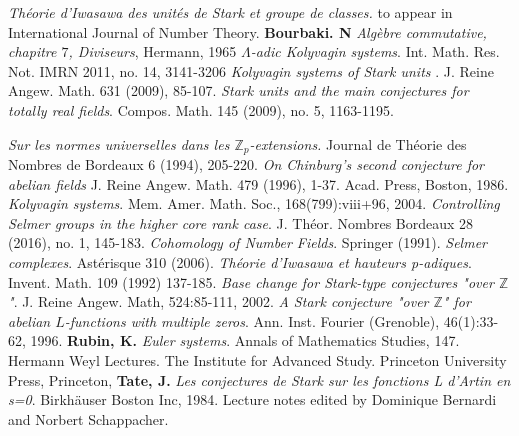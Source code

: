\documentclass[reqno]{amsart}
\begin{document}
\begin{thebibliography}{99}
     \setlength{\parskip}{0cm}
   {\it  Théorie d'Iwasawa des unités de Stark et groupe de
  classes.} to appear in  International Journal of Number Theory.
   {\bf Bourbaki. N} {\it Algèbre commutative, chapitre $7$, Diviseurs}, Hermann, 1965
    {\it $\Lambda$-adic Kolyvagin systems}. Int. Math. Res. Not. IMRN 2011, no. 14, 3141-3206
  {\it Kolyvagin systems of Stark
 units }. J. Reine Angew. Math. 631 (2009), 85-107.
      {\it Stark units and the main conjectures for totally real fields}.
      Compos. Math. 145 (2009), no. 5, 1163-1195.
 
 

 
  {\it Sur les normes universelles dans
les $\mathbb{Z}_{p}$-extensions.} Journal de Théorie des Nombres de
Bordeaux 6 (1994), 205-220.
  {\it On Chinburg's second conjecture for abelian fields}
 J. Reine Angew. Math. 479 (1996), 1-37.
Acad. Press, Boston, 1986.
  {\it Kolyvagin systems}. Mem. Amer. Math. Soc., 168(799):\textrm{viii}+96, 2004.
 {\it Controlling Selmer groups in the higher core rank
case}. J. Théor. Nombres Bordeaux 28 (2016), no. 1, 145-183.
 {\it Cohomology of Number Fields}. Springer (1991).
 {\it Selmer complexes}. Astérisque 310 (2006).
 {\it Théorie d'Iwasawa et hauteurs p-adiques}. Invent. Math. 109 (1992) 137-185.
 {\it Base change for Stark-type conjectures "over
$\mathbb{Z}$"}. J. Reine Angew. Math, 524:85-111, 2002.
 {\it  A Stark conjecture "over $\mathbb{Z}$" for abelian $L$-functions with multiple
zeros}. Ann. Inst. Fourier (Grenoble), 46(1):33-62, 1996.
   {\bf    Rubin, K.} {\it  Euler systems}. Annals of Mathematics Studies, 147.
        Hermann Weyl Lectures. The Institute for Advanced Study. Princeton
        University Press, Princeton,
  {\bf Tate, J.} {\it Les conjectures de Stark sur les fonctions L d'Artin en s=0}.
Birkh\"{a}user Boston Inc, 1984. Lecture notes edited by Dominique
Bernardi and Norbert Schappacher.
\end{thebibliography}\vskip 10pt
\end{document}
